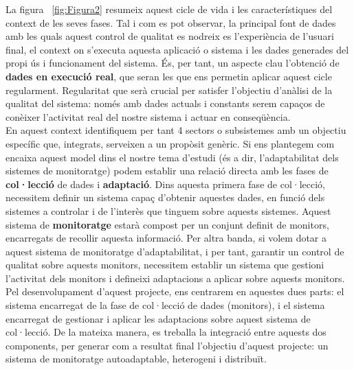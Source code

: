 La figura ~\ref{fig:Figura2} resumeix aquest cicle de vida i les característiques del context de les seves fases. Tal i com es pot observar, la principal font de dades amb les quals aquest control de qualitat es nodreix es l'experiència de l'usuari final, el context on s'executa aquesta aplicació o sistema i les dades generades del propi ús i funcionament del sistema. És, per tant, un aspecte clau l'obtenció de \textbf{dades en execució real}, que seran les que ens permetin aplicar aquest cicle regularment. Regularitat que serà crucial per satisfer l'objectiu d'anàlisi de la qualitat del sistema: només amb dades actuals i constants serem capaços de conèixer l'activitat real del nostre sistema i actuar en conseqüència.\\

En aquest context identifiquem per tant 4 sectors o subsistemes amb un objectiu específic que, integrats, serveixen a un propòsit genèric. Si ens plantegem com encaixa aquest model dins el nostre tema d'estudi (és a dir, l'adaptabilitat dels sistemes de monitoratge) podem establir una relació directa amb les fases de \textbf{col·lecció} de dades i \textbf{adaptació}. Dins aquesta primera fase de col·lecció, necessitem definir un sistema capaç d'obtenir aquestes dades, en funció dels sistemes a controlar i de l'interès que tinguem sobre aquests sistemes. Aquest sistema de \textbf{monitoratge} estarà compost per un conjunt definit de monitors, encarregats de recollir aquesta informació. Per altra banda, si volem dotar a aquest sistema de monitoratge d'adaptabilitat, i per tant, garantir un control de qualitat sobre aquests monitors, necessitem establir un sistema que gestioni l'activitat dels monitors i defineixi adaptacions a aplicar sobre aquests monitors.\\

Pel desenvolupament d'aquest projecte, ens centrarem en aquestes dues parts: el sistema encarregat de la fase de col·lecció de dades (monitors), i el sistema encarregat de gestionar i aplicar les adaptacions sobre aquest sistema de col·lecció. De la mateixa manera, es treballa la integració entre aquests dos components, per generar com a resultat final l'objectiu d'aquest projecte: un sistema de monitoratge autoadaptable, heterogeni i distribuït.